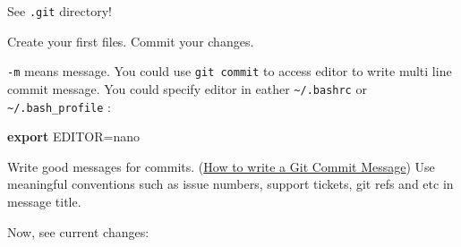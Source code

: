 \documentclass[a4paper,10pt]{article}
\newenvironment{Shaded}{}{}
\newcommand{\KeywordTok}[1]{\textcolor[rgb]{0.00,0.44,0.13}{\textbf{{#1}}}}
\newcommand{\StringTok}[1]{\textcolor[rgb]{0.25,0.44,0.63}{{#1}}}
\newcommand{\OtherTok}[1]{\textcolor[rgb]{0.00,0.44,0.13}{{#1}}}
\newcommand{\NormalTok}[1]{{#1}}
\begin{document}
\begin{Shaded}
\end{Shaded}

See \texttt{.git} directory!

Create your first files. Commit your changes.

\begin{Shaded}
\end{Shaded}

\texttt{-m} means message. You could use \texttt{git commit} to access
editor to write multi line commit message. You could specify editor in
eather \texttt{\textasciitilde{}/.bashrc} or
\texttt{\textasciitilde{}/.bash\_profile} :

\begin{Shaded}
\begin{Highlighting}[]
\KeywordTok{export} \OtherTok{EDITOR=}\NormalTok{nano}
\end{Highlighting}
\end{Shaded}

Write good messages for commits.
(\href{http://chris.beams.io/posts/git-commit/}{How to write a Git
Commit Message}) Use meaningful conventions such as issue numbers,
support tickets, git refs and etc in message title.

Now, see current changes:

\begin{Shaded}
\end{Shaded}

\begin{Shaded}
\end{Shaded}
\end{document}

